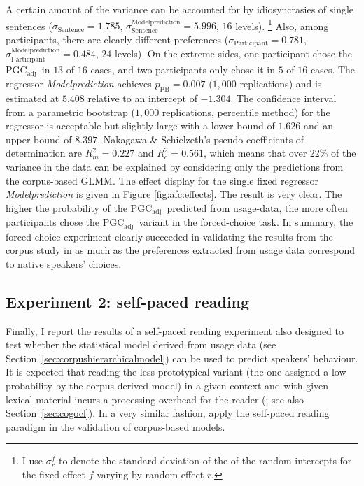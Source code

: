 \documentclass[USenglish]{article}
\newcommand{\Sub}[1]{\ensuremath{\mathrm{_{#1}}}}
\newcommand{\mpPB}{\ensuremath{p_{\text{PB}}}}
\newcommand{\PGCa}{PGC\Sub{adj}}
\begin{document}
A certain amount of the variance can be accounted for by idiosyncrasies of single sentences ($\sigma_{\text{Sentence}}=1.785$, $\sigma^{\text{Modelprediction}}_{\text{Sentence}}=5.996$, $16$ levels).%
\footnote{I use $\sigma^f_r$ to denote the standard deviation of the of the random intercepts for the fixed effect $f$ varying by random effect $r$.}
Also, among participants, there are clearly different preferences ($\sigma_{\text{Participant}}=0.781$, $\sigma^{\text{Modelprediction}}_{\text{Participant}}=0.484$, $24$ levels).
On the extreme sides, one participant chose the \PGCa\ in $13$ of $16$ cases, and two participants only chose it in $5$ of $16$ cases.
The regressor \textit{Modelprediction} achieves $\mpPB=0.007$ ($1,000$ replications) and is estimated at $5.408$ relative to an intercept of $-1.304$.
The confidence interval from a parametric bootstrap ($1,000$ replications, percentile method) for the regressor is acceptable but slightly large with a lower bound of $1.626$ and an upper bound of $8.397$.
Nakagawa \& Schielzeth's pseudo-coefficients of determination are $R^2_{m}=0.227$ and $R^2_{c}=0.561$, which means that over 22\% of the variance in the data can be explained by considering only the predictions from the corpus-based GLMM.
The effect display for the single fixed regressor \textit{Modelprediction} is given in Figure \ref{fig:afc:effects}.
The result is very clear.
The higher the probability of the \PGCa\ predicted from usage-data, the more often participants chose the \PGCa\ variant in the forced-choice task.
In summary, the forced choice experiment clearly succeeded in validating the results from the corpus study in as much as the preferences extracted from usage data correspond to native speakers' choices.



\subsection{Experiment 2: self-paced reading}
\label{sec:exp:spr}

Finally, I report the results of a self-paced reading experiment also designed to test whether the statistical model derived from usage data (see Section~\ref{sec:corpushierarchicalmodel}) can be used to predict speakers' behaviour.
It is expected that reading the less prototypical variant (the one assigned a low probability by the corpus-derived model) in a given context and with given lexical material incurs a processing overhead for the reader (\citealp{Kaiser2013}; see also Section~\ref{sec:cogocl}).
In a very similar fashion, \cite{DivjakEa2016} apply the self-paced reading paradigm in the validation of corpus-based models.
\end{document}
